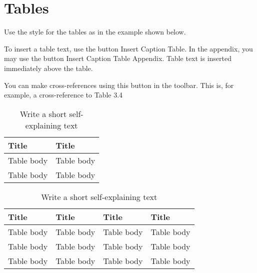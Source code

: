 \section{Tables}
Use the style for the tables as in the example shown below. 

To insert a table text, use the button Insert Caption Table. In the appendix, you may use the button Insert Caption Table Appendix. Table text is inserted immediately above the table. 

You can make cross-references using this button in the toolbar. This is, for example, a cross-reference to Table 3.4

\begin{table}[h]
\centering
\caption{Write a short self-explaining text}
\begin{tabular}{|l|l|}
\hline
\textbf{Title} & \textbf{Title} \\ \hline
Table body     & Table body     \\ \hline
Table body     & Table body     \\ \hline
\end{tabular}
\end{table}


\begin{table}[h]
\centering
\caption{Write a short self-explaining text}
\begin{tabular}{|l|l|l|l|}
\hline
\textbf{Title} & \textbf{Title} & \textbf{Title} & \textbf{Title} \\ \hline
Table body     & Table body     & Table body     & Table body     \\ \hline
Table body     & Table body     & Table body     & Table body     \\ \hline
Table body     & Table body     & Table body     & Table body     \\ \hline
\end{tabular}
\end{table}
